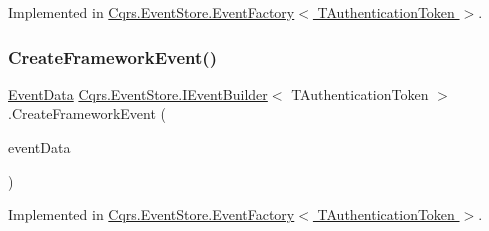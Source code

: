 Implemented in \hyperlink{classCqrs_1_1EventStore_1_1EventFactory_adbcf9f3c67cfef3fe894e5fb53e8b800_adbcf9f3c67cfef3fe894e5fb53e8b800}{Cqrs.\+Event\+Store.\+Event\+Factory$<$ T\+Authentication\+Token $>$}.

\mbox{\label{interfaceCqrs_1_1EventStore_1_1IEventBuilder_a8ee9560f7b53c67b9946c3b0719eca96_a8ee9560f7b53c67b9946c3b0719eca96}} 
\subsubsection{\texorpdfstring{Create\+Framework\+Event()}{CreateFrameworkEvent()}\hspace{0.1cm}{\footnotesize\ttfamily [2/4]}}
{\footnotesize\ttfamily \hyperlink{classCqrs_1_1Events_1_1EventData}{Event\+Data} \hyperlink{interfaceCqrs_1_1EventStore_1_1IEventBuilder}{Cqrs.\+Event\+Store.\+I\+Event\+Builder}$<$ T\+Authentication\+Token $>$.Create\+Framework\+Event (\begin{DoxyParamCaption}\item[{\hyperlink{interfaceCqrs_1_1Events_1_1IEvent}{I\+Event}$<$ T\+Authentication\+Token $>$}]{event\+Data }\end{DoxyParamCaption})}



Implemented in \hyperlink{classCqrs_1_1EventStore_1_1EventFactory_ae514998a8368283f882014cc0db5b2b2_ae514998a8368283f882014cc0db5b2b2}{Cqrs.\+Event\+Store.\+Event\+Factory$<$ T\+Authentication\+Token $>$}.

\mbox{\label{interfaceCqrs_1_1EventStore_1_1IEventBuilder_ab9608f44e12ce029fc98ad0eee53516a_ab9608f44e12ce029fc98ad0eee53516a}} 
